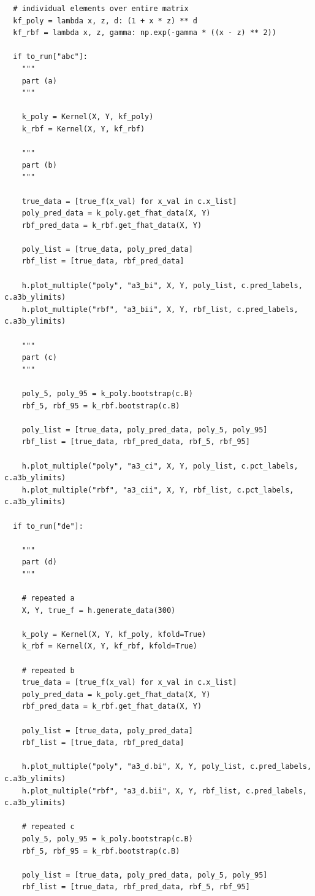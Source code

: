 \documentclass{article}
\newcommand{\1}{\mathbf{1}}
\begin{document}
{\begin{verbatim}
  # individual elements over entire matrix
  kf_poly = lambda x, z, d: (1 + x * z) ** d
  kf_rbf = lambda x, z, gamma: np.exp(-gamma * ((x - z) ** 2))

  if to_run["abc"]:
    """
    part (a)
    """

    k_poly = Kernel(X, Y, kf_poly)
    k_rbf = Kernel(X, Y, kf_rbf)

    """
    part (b)
    """

    true_data = [true_f(x_val) for x_val in c.x_list]
    poly_pred_data = k_poly.get_fhat_data(X, Y)
    rbf_pred_data = k_rbf.get_fhat_data(X, Y)

    poly_list = [true_data, poly_pred_data]
    rbf_list = [true_data, rbf_pred_data]

    h.plot_multiple("poly", "a3_bi", X, Y, poly_list, c.pred_labels, c.a3b_ylimits)
    h.plot_multiple("rbf", "a3_bii", X, Y, rbf_list, c.pred_labels, c.a3b_ylimits)

    """
    part (c)
    """

    poly_5, poly_95 = k_poly.bootstrap(c.B)
    rbf_5, rbf_95 = k_rbf.bootstrap(c.B)

    poly_list = [true_data, poly_pred_data, poly_5, poly_95]
    rbf_list = [true_data, rbf_pred_data, rbf_5, rbf_95]

    h.plot_multiple("poly", "a3_ci", X, Y, poly_list, c.pct_labels, c.a3b_ylimits)
    h.plot_multiple("rbf", "a3_cii", X, Y, rbf_list, c.pct_labels, c.a3b_ylimits)

  if to_run["de"]:

    """
    part (d)
    """

    # repeated a
    X, Y, true_f = h.generate_data(300)

    k_poly = Kernel(X, Y, kf_poly, kfold=True)
    k_rbf = Kernel(X, Y, kf_rbf, kfold=True)

    # repeated b
    true_data = [true_f(x_val) for x_val in c.x_list]
    poly_pred_data = k_poly.get_fhat_data(X, Y)
    rbf_pred_data = k_rbf.get_fhat_data(X, Y)

    poly_list = [true_data, poly_pred_data]
    rbf_list = [true_data, rbf_pred_data]

    h.plot_multiple("poly", "a3_d.bi", X, Y, poly_list, c.pred_labels, c.a3b_ylimits)
    h.plot_multiple("rbf", "a3_d.bii", X, Y, rbf_list, c.pred_labels, c.a3b_ylimits)

    # repeated c
    poly_5, poly_95 = k_poly.bootstrap(c.B)
    rbf_5, rbf_95 = k_rbf.bootstrap(c.B)

    poly_list = [true_data, poly_pred_data, poly_5, poly_95]
    rbf_list = [true_data, rbf_pred_data, rbf_5, rbf_95]


\end{verbatim}}
\end{document}
